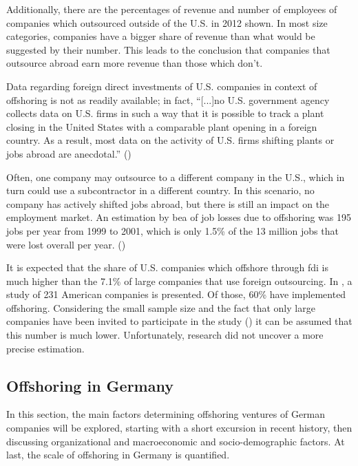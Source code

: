 Additionally, there are the percentages of revenue and number of employees of companies which outsourced outside of the U.S. in 2012 shown. In most size categories, companies have a bigger share of revenue than what would be suggested by their number. This leads to the conclusion that companies that outsource abroad earn more revenue than those which don't.


Data regarding foreign direct investments of U.S. companies in context of offshoring is not as readily available; in fact, ``[...]no U.S. government agency collects data on U.S. firms in such a way that it is possible to track a plant closing in the United States with a comparable plant opening in a foreign country. As a result, most data on the activity of U.S. firms shifting plants or jobs abroad are anecdotal.'' (\cite{Jackson.2013})


Often, one company may outsource to a different company in the U.S., which in turn could use a subcontractor in a different country. In this scenario, no company has actively shifted jobs abroad, but there is still an impact on the employment market. An estimation by \gls{bea} of job losses due to offshoring was 195  jobs per year from 1999 to 2001, which is only 1.5\% of the 13 million jobs that were lost overall per year. (\cite[pp. 14ff]{Kozlow.2006})

It is expected that the share of U.S. companies which offshore through \gls{fdi} is much higher than the 7.1\% of large companies that use foreign outsourcing. In \cite[pp. 167ff]{Hutzschenreuter.2007}, a study of 231 American companies is presented. Of those, 60\% have implemented offshoring. Considering the small sample size and the fact that only large companies have been invited to participate in the study (\cite[pp. 199f]{Hutzschenreuter.2007}) it can be assumed that this number is much lower. Unfortunately, research did not uncover a more precise estimation.

\subsection{Offshoring in Germany}
\label{sec:OffshoringGER}
In this section, the main factors determining offshoring ventures of German companies will be explored, starting with a short excursion in recent history, then discussing organizational and macroeconomic and socio-demographic factors. At last, the scale of offshoring in Germany is quantified.

